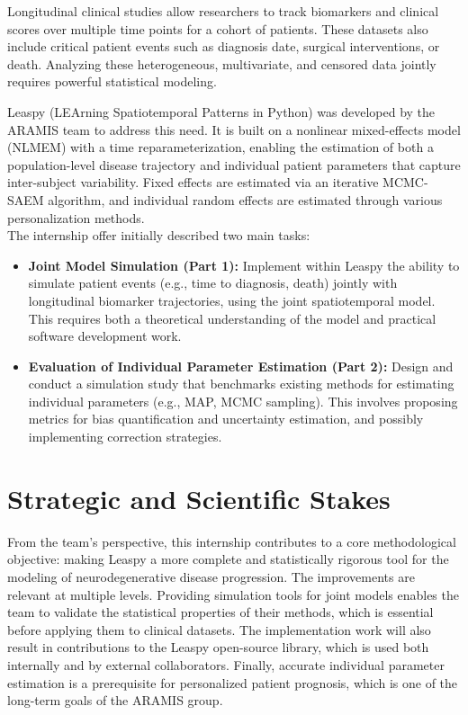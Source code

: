 \documentclass{rapportCS}
\begin{document}
Longitudinal clinical studies allow researchers to track biomarkers and clinical scores over multiple time points for a cohort of patients. These datasets also include critical patient events such as diagnosis date, surgical interventions, or death. Analyzing these heterogeneous, multivariate, and censored data jointly requires powerful statistical modeling.

Leaspy (LEArning Spatiotemporal Patterns in Python) was developed by the ARAMIS team to address this need. It is built on a nonlinear mixed-effects model (NLMEM) with a time reparameterization, enabling the estimation of both a population-level disease trajectory and individual patient parameters that capture inter-subject variability. Fixed effects are estimated via an iterative MCMC-SAEM algorithm, and individual random effects are estimated through various personalization methods. \\

\noindent The internship offer initially described two main tasks:

\begin{itemize}
    \item \textbf{Joint Model Simulation (Part 1):} Implement within Leaspy the ability to simulate patient events (e.g., time to diagnosis, death) jointly with longitudinal biomarker trajectories, using the joint spatiotemporal model. This requires both a theoretical understanding of the model and practical software development work.
 
    \item \textbf{Evaluation of Individual Parameter Estimation (Part 2):} Design and conduct a simulation study that benchmarks existing methods for estimating individual parameters (e.g., MAP, MCMC sampling). This involves proposing metrics for bias quantification and uncertainty estimation, and possibly implementing correction strategies.
\end{itemize}

\section{Strategic and Scientific Stakes}

From the team's perspective, this internship contributes to a core methodological objective: making Leaspy a more complete and statistically rigorous tool for the modeling of neurodegenerative disease progression. The improvements are relevant at multiple levels. Providing simulation tools for joint models enables the team to validate the statistical properties of their methods, which is essential before applying them to clinical datasets. The implementation work will also result in contributions to the Leaspy open-source library, which is used both internally and by external collaborators. Finally, accurate individual parameter estimation is a prerequisite for personalized patient prognosis, which is one of the long-term goals of the ARAMIS group.
\end{document}
